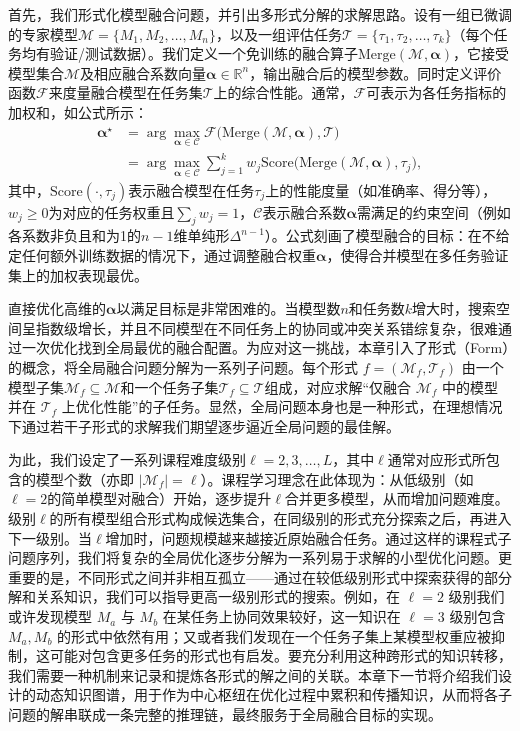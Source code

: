 \documentclass[../main.tex]{subfiles}
\begin{document}
首先，我们形式化模型融合问题，并引出多形式分解的求解思路。设有一组已微调的专家模型$\mathcal{M}=\{M_{1}, M_{2}, \ldots, M_{n}\}$，以及一组评估任务$\mathcal{T}=\{\tau_{1}, \tau_{2}, \ldots, \tau_{k}\}$（每个任务均有验证/测试数据）。我们定义一个免训练的融合算子$\mathrm{Merge}(\mathcal{M}, \boldsymbol{\alpha})$，它接受模型集合$\mathcal{M}$及相应融合系数向量$\boldsymbol{\alpha}\in \mathbb{R}^n$，输出融合后的模型参数。同时定义评价函数$\mathcal{F}$来度量融合模型在任务集$\mathcal{T}$上的综合性能。通常，$\mathcal{F}$可表示为各任务指标的加权和，如公式所示：
\begin{equation}
	\begin{aligned}
		\boldsymbol{\alpha}^{\star} & = \arg\max_{\boldsymbol{\alpha}\in\mathcal{C}} \mathcal{F}\Big(\mathrm{Merge}(\mathcal{M},\boldsymbol{\alpha}), \mathcal{T}\Big)                 \\
		{}                          & = \arg\max_{\boldsymbol{\alpha}\in\mathcal{C}} \sum_{j=1}^{k} w_j \text{Score}\Big(\mathrm{Merge}(\mathcal{M},\boldsymbol{\alpha}), \tau_j\Big),
	\end{aligned}
\end{equation}
其中，$\text{Score}(\cdot,\tau_j)$表示融合模型在任务$\tau_j$上的性能度量（如准确率、得分等），$w_j \ge 0$为对应的任务权重且$\sum_{j}w_j=1$，$\mathcal{C}$表示融合系数$\boldsymbol{\alpha}$需满足的约束空间（例如各系数非负且和为1的$n-1$维单纯形$\Delta^{n-1}$）。公式刻画了模型融合的目标：在不给定任何额外训练数据的情况下，通过调整融合权重$\boldsymbol{\alpha}$，使得合并模型在多任务验证集上的加权表现最优。

直接优化高维的$\boldsymbol{\alpha}$以满足目标是非常困难的。当模型数$n$和任务数$k$增大时，搜索空间呈指数级增长，并且不同模型在不同任务上的协同或冲突关系错综复杂，很难通过一次优化找到全局最优的融合配置。为应对这一挑战，本章引入了形式（Form）的概念，将全局融合问题分解为一系列子问题。每个形式 $f=(\mathcal{M}_f,\mathcal{T}_f)$ 由一个模型子集$\mathcal{M}_f \subseteq \mathcal{M}$和一个任务子集$\mathcal{T}_f \subseteq \mathcal{T}$组成，对应求解“仅融合 $\mathcal{M}_f$ 中的模型并在 $\mathcal{T}_f$ 上优化性能”的子任务。显然，全局问题本身也是一种形式，在理想情况下通过若干子形式的求解我们期望逐步逼近全局问题的最佳解。

为此，我们设定了一系列课程难度级别$\ell=2,3,\ldots,L$，其中$\ell$通常对应形式所包含的模型个数（亦即 $|\mathcal{M}_f|=\ell$）。课程学习理念在此体现为：从低级别（如$\ell=2$的简单模型对融合）开始，逐步提升$\ell$合并更多模型，从而增加问题难度。级别$\ell$的所有模型组合形式构成候选集合，在同级别的形式充分探索之后，再进入下一级别。当$\ell$增加时，问题规模越来越接近原始融合任务。通过这样的课程式子问题序列，我们将复杂的全局优化逐步分解为一系列易于求解的小型优化问题。更重要的是，不同形式之间并非相互孤立——通过在较低级别形式中探索获得的部分解和关系知识，我们可以指导更高一级别形式的搜索。例如，在 $\ell=2$ 级别我们或许发现模型 $M_a$ 与 $M_b$ 在某任务上协同效果较好，这一知识在 $\ell=3$ 级别包含 $M_a, M_b$ 的形式中依然有用；又或者我们发现在一个任务子集上某模型权重应被抑制，这可能对包含更多任务的形式也有启发。要充分利用这种跨形式的知识转移，我们需要一种机制来记录和提炼各形式的解之间的关联。本章下一节将介绍我们设计的动态知识图谱，用于作为中心枢纽在优化过程中累积和传播知识，从而将各子问题的解串联成一条完整的推理链，最终服务于全局融合目标的实现。
\end{document}
